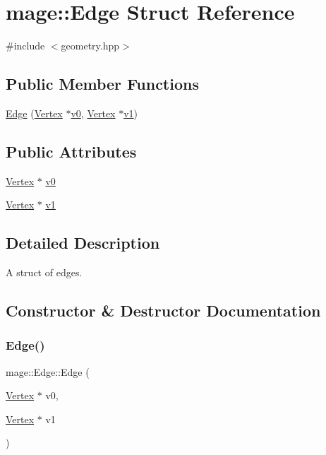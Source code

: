 \hypertarget{structmage_1_1_edge}{}\section{mage\+:\+:Edge Struct Reference}
\label{structmage_1_1_edge}


{\ttfamily \#include $<$geometry.\+hpp$>$}

\subsection*{Public Member Functions}
\begin{DoxyCompactItemize}
\item 
\hyperlink{structmage_1_1_edge_ae02d9b1c72160ca43f053b742d04fc32}{Edge} (\hyperlink{structmage_1_1_vertex}{Vertex} $\ast$\hyperlink{structmage_1_1_edge_a2558fb174f3d4cbf4b4732604236ec10}{v0}, \hyperlink{structmage_1_1_vertex}{Vertex} $\ast$\hyperlink{structmage_1_1_edge_a10072b2b5d8897431d0e4beb6eaf1ad1}{v1})
\end{DoxyCompactItemize}
\subsection*{Public Attributes}
\begin{DoxyCompactItemize}
\item 
\hyperlink{structmage_1_1_vertex}{Vertex} $\ast$ \hyperlink{structmage_1_1_edge_a2558fb174f3d4cbf4b4732604236ec10}{v0}
\item 
\hyperlink{structmage_1_1_vertex}{Vertex} $\ast$ \hyperlink{structmage_1_1_edge_a10072b2b5d8897431d0e4beb6eaf1ad1}{v1}
\end{DoxyCompactItemize}


\subsection{Detailed Description}
A struct of edges. 

\subsection{Constructor \& Destructor Documentation}
\hypertarget{structmage_1_1_edge_ae02d9b1c72160ca43f053b742d04fc32}{}\label{structmage_1_1_edge_ae02d9b1c72160ca43f053b742d04fc32} 
\subsubsection{\texorpdfstring{Edge()}{Edge()}}
{\footnotesize\ttfamily mage\+::\+Edge\+::\+Edge (\begin{DoxyParamCaption}\item[{\hyperlink{structmage_1_1_vertex}{Vertex} $\ast$}]{v0,  }\item[{\hyperlink{structmage_1_1_vertex}{Vertex} $\ast$}]{v1 }\end{DoxyParamCaption})}


